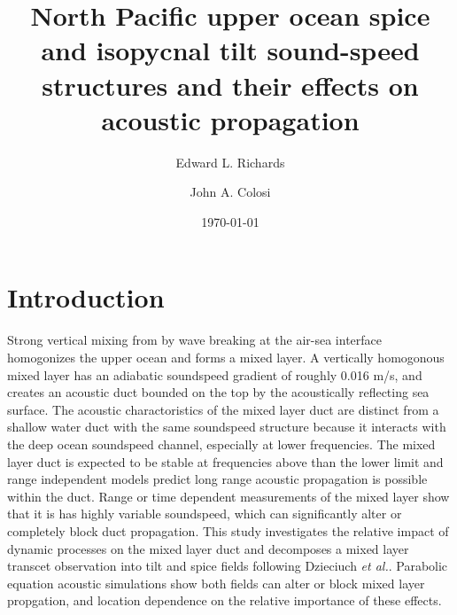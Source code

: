 \documentclass[preprint,NumberedRefs]{JASA}
\begin{document}
\title[Mixed layer tilt and spice]{North Pacific upper ocean spice and isopycnal tilt sound-speed structures and their effects on acoustic propagation}
\author{Edward L. Richards}
\author{John A. Colosi}


\date{\today}


\begin{abstract}

\end{abstract}

\maketitle

\section{\label{sec:intro} Introduction}
Strong vertical mixing from by wave breaking at the air-sea interface homogonizes the upper ocean and forms a mixed layer. A vertically homogonous mixed layer has an adiabatic soundspeed gradient of roughly 0.016 m/s, and creates an acoustic duct bounded on the top by the acoustically reflecting sea surface. The acoustic charactoristics of the mixed layer duct are distinct from a shallow water duct with the same soundspeed structure because it interacts with the deep ocean soundspeed channel\citep{porter93}, especially at lower frequencies. The mixed layer duct is expected to be stable at frequencies above than the lower limit\citep{Urick1982Prop} and range independent models predict long range acoustic propagation is possible within the duct. Range or time dependent measurements of the mixed layer show that it is has highly variable soundspeed\citep{cole2010seasonal,rudnick1999compensation,klymak2015}, which can significantly alter or completely block duct propagation\citep{colosi2020observations,colosi21}. This study investigates the relative impact of dynamic processes on the mixed layer duct and decomposes a mixed layer transcet observation into tilt and spice fields following Dzieciuch \emph{et al.}\citep{dzieciuch2004}. Parabolic equation acoustic simulations\citep{collins93} show both fields can alter or block mixed layer propgation, and location dependence on the relative importance of these effects.
\end{document}
